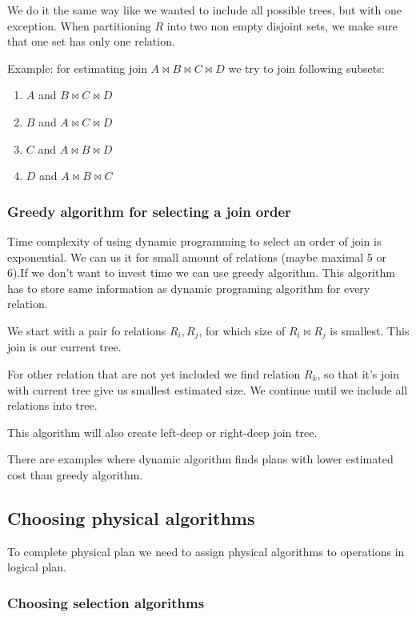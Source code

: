 We do it the same way like we wanted to include all possible trees, but with one exception. When partitioning $R$ into two non empty disjoint sets, we make sure that one set has only one relation.

Example: for estimating join $A\Join B\Join C\Join D$ we try to join following subsets:
\begin{enumerate}
\item $A$ and $B\Join C\Join D$
\item $B$ and $A\Join C\Join D$
\item $C$ and $A\Join B\Join D$
\item $D$ and $A\Join B\Join C$
\end{enumerate}

\subsubsection{Greedy algorithm for selecting a join order}

Time complexity of using dynamic programming to select an order of join is exponential. We can us it for small amount of relations (maybe maximal 5 or 6).If we don't want to invest time we can use greedy algorithm. This algorithm has to store same information as dynamic programing algorithm for every relation.

We start with a pair fo relations $R_i, R_j$, for which size of $R_i \Join R_j$ is smallest. This join is our current tree.

For other relation that are not yet included we find relation $R_k$, so that it's join with current tree give us smallest estimated size. We continue until we include all relations into tree. 

This algorithm will also create left-deep or right-deep join tree.

There are examples where dynamic algorithm finds plans with lower estimated cost than greedy algorithm.
 
\subsection{Choosing physical algorithms}

To complete physical plan we need to assign physical algorithms to operations in logical plan.
\subsubsection{Choosing selection algorithms}


